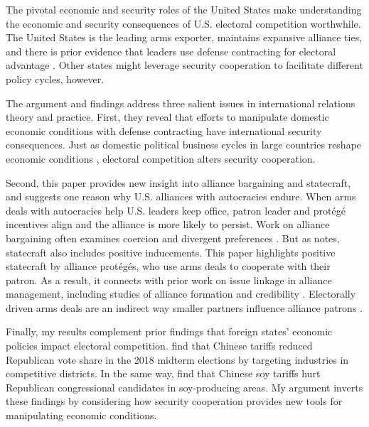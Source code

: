 \documentclass[12pt]{article}
\begin{document}
The pivotal economic and security roles of the United States make understanding the economic and security consequences of U.S. electoral competition worthwhile. 
The United States is the leading arms exporter, maintains expansive alliance ties, and there is prior evidence that leaders use defense contracting for electoral advantage \citep{DerouenHeo2000}. 
Other states might leverage security cooperation to facilitate different policy cycles, however. 


The argument and findings address three salient issues in international relations theory and practice. 
First, they reveal that efforts to manipulate domestic economic conditions with defense contracting have international security consequences. 
Just as domestic political business cycles in large countries reshape economic conditions \citep{Kayser2006, Kayser2009}, electoral competition alters security cooperation. 


Second, this paper provides new insight into alliance bargaining and statecraft, and suggests one reason why U.S. alliances with autocracies endure. 
When arms deals with autocracies help U.S. leaders keep office, patron leader and prot{\'e}g{\'e} incentives align and the alliance is more likely to persist.
Work on alliance bargaining often examines coercion and divergent preferences \citep{Oatley2015, WolfordKim2017, Resnick2019, Blankenship2020, Beckeretal2023}. %
But as \citet{Baldwin2020} notes, statecraft also includes positive inducements. 
This paper highlights positive statecraft by alliance prot{\'e}g{\'e}s, who use arms deals to cooperate with their patron.
As a result, it connects with prior work on issue linkage in alliance management, including studies of alliance formation \citep{Poast2012} and credibility \citep{Davis2008, Poast2013}.
Electorally driven arms deals are an indirect way smaller partners influence alliance patrons \citep{Keohane1971}.


Finally, my results complement prior findings that foreign states' economic policies impact electoral competition. 
\citet{KimMargalit2021} find that Chinese tariffs reduced Republican vote share in the 2018 midterm elections by targeting industries in competitive districts.
In the same way, \citet{ChyzhUrbatsch2021} find that Chinese soy tariffs hurt Republican congressional candidates in soy-producing areas. 
My argument inverts these findings by considering how security cooperation provides new tools for manipulating economic conditions. 
\end{document}
